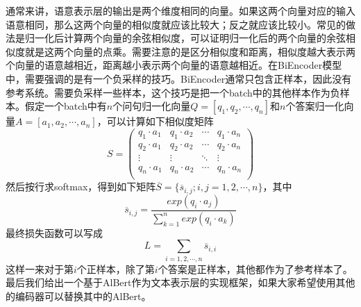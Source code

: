\documentclass[twoside,a4paper,12pt]{book}%
\begin{document}
通常来讲，语意表示层的输出是两个维度相同的向量。如果这两个向量对应的输入语意相同，那么这两个向量的相似度就应该比较大；反之就应该比较小。常见的做法是归一化后计算两个向量的余弦相似度，可以证明归一化后的两个向量的余弦相似度就是这两个向量的点乘。需要注意的是区分相似度和距离，相似度越大表示两个向量的语意越相近，距离越小表示两个向量的语意越相近。在BiEncoder模型中，需要强调的是有一个负采样的技巧。BiEncoder通常只包含正样本，因此没有参考系统。需要负采样一些样本，这个技巧是把一个batch中的其他样本作为负样本。假定一个batch中有$n$个问句归一化向量$Q=[q_1,q_2,\cdots,q_n]$和$n$个答案归一化向量$A=[a_1,a_2,\cdots,a_n]$，可以计算如下相似度矩阵
$$S=
\begin{pmatrix}
q_1\cdot a_1 & q_1\cdot a_2 & \cdots & q_1\cdot a_n \\
q_2\cdot a_1 & q_2\cdot a_2 & \cdots & q_2\cdot a_n \\ 
\vdots & \vdots & \ddots & \vdots \\
q_n\cdot a_1 & q_n\cdot a_2 & \cdots & q_n\cdot a_n \\
\end{pmatrix}
$$
然后按行求softmax，得到如下矩阵$\overline{S}=\{\overline{s}_{i,j};i,j=1,2,\cdots ,n\}$，其中
$$
\overline{s}_{i,j} = \frac{exp(q_i \cdot a_j)}{\sum_{k=1}^{n}{exp(q_i \cdot a_k)}}
$$
最终损失函数可以写成
$$
L=\sum_{i=1,2,\cdots ,n}{\overline{s}_{i,i}}
$$
这样一来对于第$i$个正样本，除了第$i$个答案是正样本，其他都作为了参考样本了。
最后我们给出一个基于AlBert作为文本表示层的实现框架，如果大家希望使用其他的编码器可以替换其中的AlBert。
\end{document}

